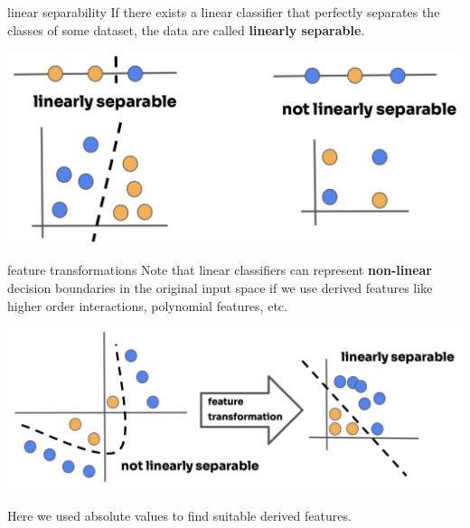 \documentclass[11pt,compress,t,notes=noshow, xcolor=table]{beamer}
\begin{document}
\begin{vbframe}{linear separability}
If there exists a linear classifier that perfectly separates the classes of some dataset, the data are called \textbf{linearly separable}.

\vspace{1cm}

\begin{center}
\includegraphics{figure_man/linear_separability-1.png} 
\end{center}

\end{vbframe}


\begin{vbframe}{feature transformations}
Note that linear classifiers can represent \textbf{non-linear} decision boundaries in the original input space if we use derived features like higher order interactions, polynomial features, etc.

\begin{center}
\includegraphics{figure_man/linear_separability-2.png} 
\end{center}

\lz

Here we used absolute values to find suitable derived features.

\end{vbframe}

\endlecture
\end{document}
